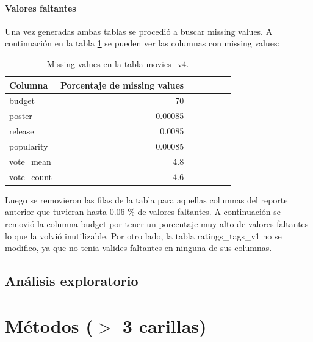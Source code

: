 \documentclass[11pt,a4paper,twoside]{thesis}
\begin{document}
\subsubsection*{Valores faltantes}

Una vez generadas ambas tablas se procedió a buscar missing values. A continuación en la tabla \ref{table:tab} 
se pueden ver las columnas con missing values:
\begin{table}[h!]
\centering
\footnotesize
\begin{tabular}{lrrrrrr}
\hline
Columna &  Porcentaje de missing values \\
\hline
   	budget     &  70      \\
   	poster     &  0.00085 \\
   	release    &  0.0085  \\
	popularity &  0.00085 \\
	vote\_mean  &  4.8     \\
	vote\_count &  4.6     \\
\hline
\end{tabular}
\caption{Missing values en la tabla movies\_v4.}
\label{table:tab}
\end{table}

Luego se removieron las filas de la tabla para aquellas columnas del reporte anterior que tuvieran hasta 0.06 \% de valores faltantes. A continuación se removió la columna budget por tener un porcentaje muy alto de valores faltantes lo que la volvió inutilizable. Por otro lado, la tabla ratings\_tags\_v1 no se modifico, ya que no tenia valides faltantes en ninguna de sus columnas.


\section{Análisis exploratorio}


\chapter{Métodos ($>$ 3 carillas)}
\end{document}
